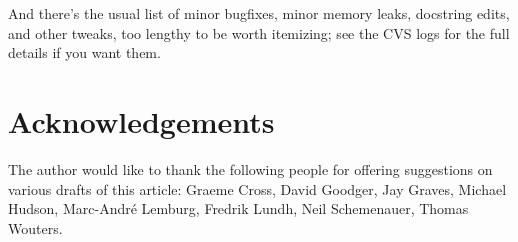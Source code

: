 \documentclass{howto}
\begin{document}
And there's the usual list of minor bugfixes, minor memory leaks,
docstring edits, and other tweaks, too lengthy to be worth itemizing;
see the CVS logs for the full details if you want them.


\section{Acknowledgements}

The author would like to thank the following people for offering
suggestions on various drafts of this article: Graeme Cross, David
Goodger, Jay Graves, Michael Hudson, Marc-Andr\'e Lemburg, Fredrik
Lundh, Neil Schemenauer, Thomas Wouters.
\end{document}
